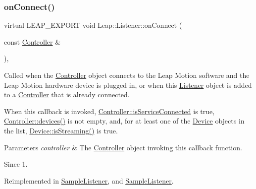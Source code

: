 \subsubsection{\texorpdfstring{on\+Connect()}{onConnect()}}
{\footnotesize\ttfamily virtual L\+E\+A\+P\+\_\+\+E\+X\+P\+O\+RT void Leap\+::\+Listener\+::on\+Connect (\begin{DoxyParamCaption}\item[{const \hyperlink{class_leap_1_1_controller}{Controller} \&}]{ }\end{DoxyParamCaption})\hspace{0.3cm}{\ttfamily [inline]}, {\ttfamily [virtual]}}

Called when the \hyperlink{class_leap_1_1_controller}{Controller} object connects to the Leap Motion software and the Leap Motion hardware device is plugged in, or when this \hyperlink{class_leap_1_1_listener}{Listener} object is added to a \hyperlink{class_leap_1_1_controller}{Controller} that is already connected.

When this callback is invoked, \hyperlink{class_leap_1_1_controller_a5162678b59f1b08b5ffb33c3a8754a76}{Controller\+::is\+Service\+Connected} is true, \hyperlink{class_leap_1_1_controller_ad3b6ea558fb39cb32c20c3fd44dc5da1}{Controller\+::devices()} is not empty, and, for at least one of the \hyperlink{class_leap_1_1_device}{Device} objects in the list, \hyperlink{class_leap_1_1_device_a0a3998a6914e09f1bcfb7e8d623bea37}{Device\+::is\+Streaming()} is true.


\begin{DoxyCodeInclude}
\end{DoxyCodeInclude}



\begin{DoxyParams}{Parameters}
{\em controller} & The \hyperlink{class_leap_1_1_controller}{Controller} object invoking this callback function. \\
\hline
\end{DoxyParams}
\begin{DoxySince}{Since}
1. 
\end{DoxySince}


Reimplemented in \hyperlink{class_sample_listener_a91dfe9f4b35bca70a38237a7a09b4ebd}{Sample\+Listener}, and \hyperlink{class_sample_listener_afb49688d9bcf7e71a7841c70a6baab1d}{Sample\+Listener}.

\mbox{\label{class_leap_1_1_listener_adb6de7817e0b316b82f781a03aae5448}} 
